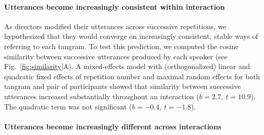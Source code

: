 \documentclass[alpha-refs]{wiley-article}
\begin{document}
\paragraph{Utterances become increasingly consistent within interaction}
As directors modified their utterances across successive repetitions, we hypothesized that they would converge on increasingly consistent, stable ways of referring to each tangram.
To test this prediction, we computed the cosine similarity between successive utterances produced by each speaker (see Fig.~\ref{fig:similarity}A). %
A mixed-effects model with (orthogonalized) linear and quadratic fixed effects of repetition number and maximal random effects for both tangram and pair of participants showed that similarity between successive utterances increased substantially throughout an interaction ($b = 2.7,~t = 10.9$).
The quadratic term was not significant ($b= -0.4,~t=-1.8$).


\paragraph{Utterances become increasingly different across interactions}
\end{document}
